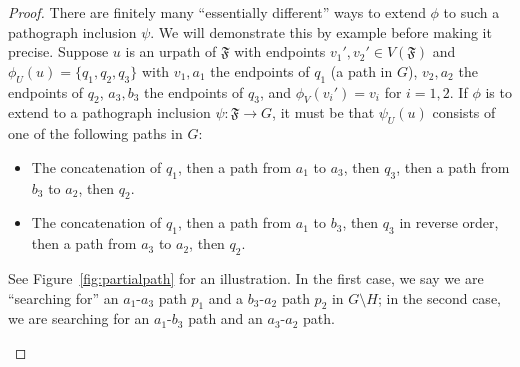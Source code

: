 \documentclass{article}
\newcommand{\alabvert}[4]{\node[dot, label={[label distance=-2pt] #4:{$#3$}}] (#1) at (#2) {};}
\newcommand{\labdotedge}[4]{\draw[dashed] (#1) -- node[midway, #4] {$#3$} (#2);}
\newcommand{\laburpath}[4]{\draw[decorate,decoration={snake,amplitude=1.5,segment length=10, post length=0,pre length=0}] (#1) -- node[midway, #4] {$#3$} (#2);}
\newcommand{\Ff}{\mathfrak{F}}
\begin{document}
\begin{proof}
There are finitely many ``essentially different'' ways to extend $\phi$ to such a pathograph inclusion $\psi$. We will demonstrate this by example before making it precise. Suppose $u$ is an urpath of $\Ff$ with endpoints $v_1',v_2'\in V(\Ff)$ and $\phi_U(u)=\{q_1,q_2,q_3\}$ with $v_1,a_1$ the endpoints of $q_1$ (a path in $G$), $v_2,a_2$ the endpoints of $q_2$, $a_3,b_3$ the endpoints of $q_3$, and $\phi_V(v_i')=v_i$ for $i=1,2$. If $\phi$ is to extend to a pathograph inclusion $\psi:\Ff\to G$, it must be that $\psi_U(u)$ consists of one of the following paths in $G$:
\begin{itemize}
    \item The concatenation of $q_1$, then a path from $a_1$ to $a_3$, then $q_3$, then a path from $b_3$ to $a_2$, then $q_2$.
    \item The concatenation of $q_1$, then a path from $a_1$ to $b_3$, then $q_3$ in reverse order, then a path from $a_3$ to $a_2$, then $q_2$.
\end{itemize}

See Figure~\ref{fig:partialpath} for an illustration. In the first case, we say we are ``searching for'' an $a_1$-$a_3$ path $p_1$ and a $b_3$-$a_2$ path $p_2$ in $G\setminus H$; in the second case, we are searching for an $a_1$-$b_3$ path and an $a_3$-$a_2$ path.

\begin{figure}[htbp!]
    \centering
\end{figure}
\end{proof}
\end{document}
